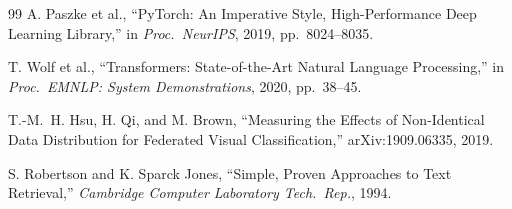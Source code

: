 \documentclass[12pt, a4paper, oneside]{Thesis}
\begin{document}
\begin{thebibliography}{99}
A. Paszke et al.,
``PyTorch: An Imperative Style, High-Performance Deep Learning Library,''
in \textit{Proc.\ NeurIPS}, 2019, pp.\ 8024--8035.

T. Wolf et al.,
``Transformers: State-of-the-Art Natural Language Processing,''
in \textit{Proc.\ EMNLP: System Demonstrations}, 2020, pp.\ 38--45.

T.-M.~H. Hsu, H. Qi, and M. Brown,
``Measuring the Effects of Non-Identical Data Distribution for Federated Visual Classification,''
arXiv:1909.06335, 2019.

S. Robertson and K. Sparck Jones,
``Simple, Proven Approaches to Text Retrieval,''
\textit{Cambridge Computer Laboratory Tech.\ Rep.}, 1994.

\end{thebibliography}
\end{document}
